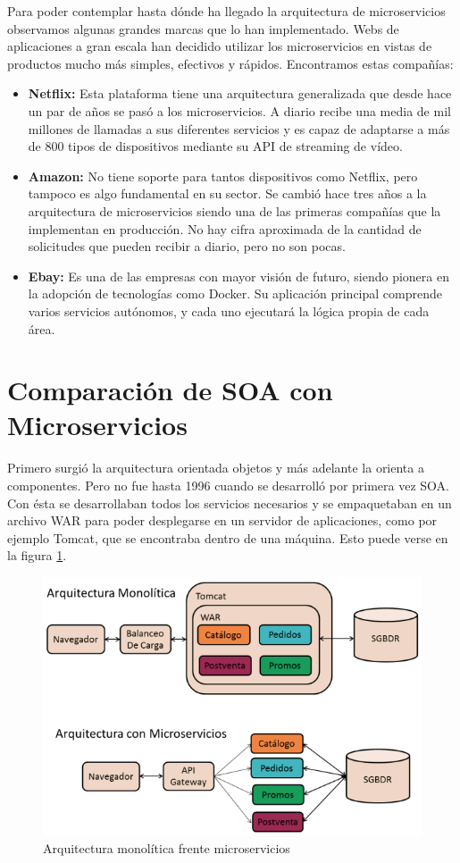 \documentclass[12pt]{report} %
\begin{document}
Para poder contemplar hasta dónde ha llegado la arquitectura de microservicios observamos algunas grandes marcas que lo han implementado. Webs de aplicaciones a gran escala han decidido utilizar los microservicios en vistas de productos mucho más simples, efectivos y rápidos. Encontramos estas compañías:
\begin{itemize}
	\item \textbf{Netflix:} Esta plataforma tiene una arquitectura generalizada que desde hace un par de años se pasó a los microservicios. A diario recibe una media de mil millones de llamadas a sus diferentes servicios y es capaz de adaptarse a más de 800 tipos de dispositivos mediante su API de streaming de vídeo.
	\item \textbf{Amazon:} No tiene soporte para tantos dispositivos como Netflix, pero tampoco es algo fundamental en su sector. Se cambió hace tres años a la arquitectura de microservicios siendo una de las primeras compañías que la implementan en producción. No hay cifra aproximada de la cantidad de solicitudes que pueden recibir a diario, pero no son pocas. 
	\item \textbf{Ebay:} Es una de las empresas con mayor visión de futuro, siendo pionera en la adopción de tecnologías como Docker. Su aplicación principal comprende varios servicios autónomos, y cada uno ejecutará la lógica propia de cada área.
\end{itemize}




\section{Comparación de SOA con Microservicios}
Primero surgió la arquitectura orientada objetos y más adelante la orienta a componentes. Pero no fue hasta 1996 cuando se desarrolló por primera vez SOA. Con ésta se desarrollaban todos los servicios necesarios y se empaquetaban en un archivo WAR para poder desplegarse en un servidor de aplicaciones, como por ejemplo Tomcat, que se encontraba dentro de una máquina. Esto puede verse en la figura \ref{fig:soavsmicroservicios}.

\begin{figure}
	\centering
	\includegraphics[width=0.7\linewidth]{imagenes/soavsmicroservicios}
	\caption{Arquitectura monolítica frente microservicios}
	\label{fig:soavsmicroservicios}
\end{figure}
\end{document}
